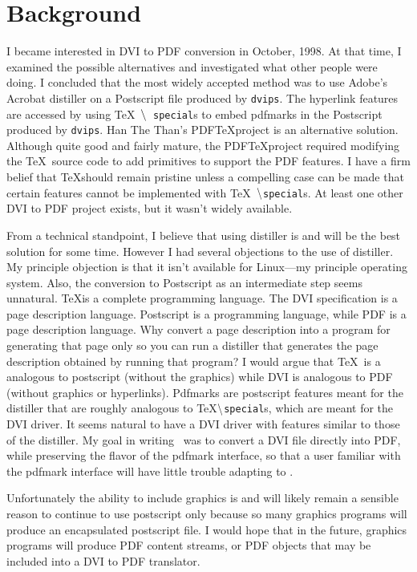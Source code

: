 \section{Background}
I became interested in DVI to PDF conversion in October, 1998.  At that
time, I examined the possible alternatives and investigated what other
people were doing. I concluded that the most widely accepted method was to
use Adobe's Acrobat distiller on a Postscript file produced by {\tt dvips}.
The hyperlink features are accessed by using \TeX\ $\tt \backslash${\tt
special}s to embed pdfmarks in the Postscript produced by {\tt dvips}.
Han The Than's PDF\TeX project is an alternative solution.
Although quite good and fairly mature, the PDF\TeX project required
modifying the \TeX\ source code to add primitives to support the PDF features.
I have a firm belief that \TeX should remain pristine
unless a compelling case can be made that certain features cannot
be implemented with \TeX\ $\tt \backslash${\tt special}s.  At least
one other DVI to PDF project exists, but it wasn't widely available.

From a technical standpoint,
I believe that using distiller is and will be the best
solution for some time.  However I had several objections to the use of distiller.
My principle objection is that it isn't available for Linux---my principle
operating system.  Also, the conversion to Postscript as an intermediate
step seems unnatural.  \TeX is a complete programming language.
The DVI specification is a page description language.
Postscript is a programming language, while PDF is a page description language.
Why convert a page description into a program for generating
that page only so you can run a distiller that generates
the page description obtained by running that program?
I would argue that \TeX\ is a analogous to postscript (without the graphics)
while DVI is analogous to PDF (without graphics or hyperlinks).
Pdfmarks are postscript features meant for the distiller that are roughly analogous
to \TeX $\tt \backslash${\tt special}s, which are meant for the DVI driver.
It seems natural to have a DVI driver with features similar to those of the
distiller.  My goal in writing \dvipdf\ was to convert a DVI file directly into PDF, while
preserving the flavor of the pdfmark
interface, so that a user familiar with the pdfmark interface
will have little trouble adapting to \dvipdf.

Unfortunately the ability to include graphics
is and will likely remain a sensible reason to continue to
use postscript only because so many graphics programs will produce an encapsulated postscript
file.  I would hope that in the future, graphics programs
will produce PDF content streams, or PDF objects that
may be included into a DVI to PDF translator.

